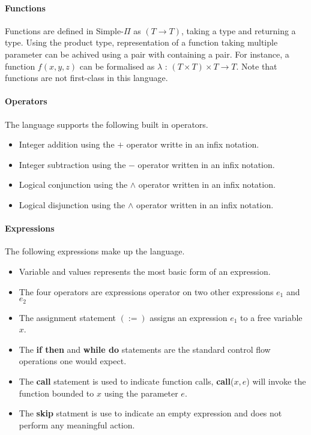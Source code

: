 \documentclass[a4paper,12pt]{report}
\begin{document}
\paragraph{Functions}
Functions are defined in Simple-$\Pi$ as $(T \longrightarrow T)$, taking a type 
and returning a type. Using the product type, representation of a function 
taking multiple parameter can be achived using a pair with containing a pair. 
For instance, a function $f(x,y,z)$ can be formalised as 
$\lambda$ : $(T \times T) \times T \longrightarrow T$. Note that functions are 
not first-class in this language.

\paragraph{Operators}
The language supports the following built in operators.
\begin{itemize}
  \item Integer addition using the $+$ operator writte in an infix notation.
  \item Integer subtraction using the $-$ operator written in an infix notation.
  \item Logical conjunction using the $\wedge$ operator written in an infix 
  notation.
  \item Logical disjunction using the $\wedge$ operator written in an infix 
  notation.
\end{itemize}

\paragraph{Expressions} The following expressions make up the language.
\begin{itemize}
  \item Variable and values represents the most basic form of an expression.
  \item The four operators are expressions operator on two other expressions $e_1$ 
  and $e_2$
  \item The assignment statement $(:=)$ assigns an expression $e_1$ to a 
  free variable $x$.
  \item The \textbf{if then} and \textbf{while do} statements are the standard control flow 
  operations one would expect.
  \item The \textbf{call} statement is used to indicate function calls, 
  \textbf{call}($x, e$) will invoke the function bounded to $x$ using the 
  parameter $e$.
  \item The \textbf{skip} statment is use to indicate an empty expression and 
  does not perform any meaningful action. 
\end{itemize}
\end{document}
